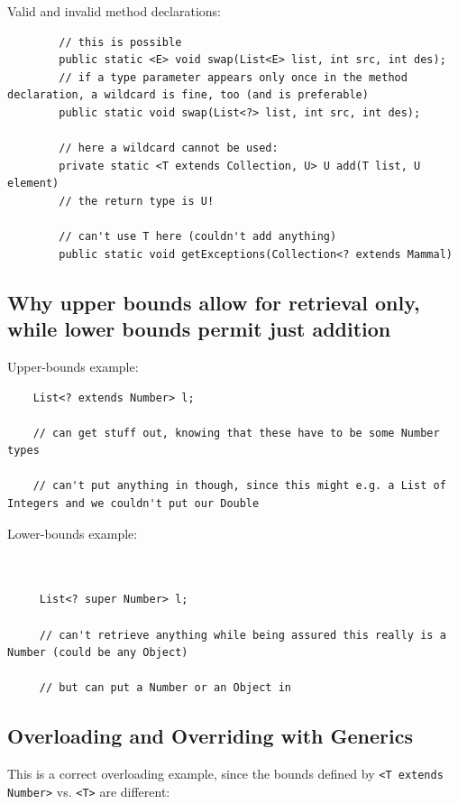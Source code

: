 \documentclass{scrartcl}
\begin{document}
    Valid and invalid method declarations:

    \begin{lstlisting}
        // this is possible
        public static <E> void swap(List<E> list, int src, int des);
        // if a type parameter appears only once in the method declaration, a wildcard is fine, too (and is preferable)
        public static void swap(List<?> list, int src, int des);

        // here a wildcard cannot be used:
        private static <T extends Collection, U> U add(T list, U element)
        // the return type is U!

        // can't use T here (couldn't add anything)
        public static void getExceptions(Collection<? extends Mammal)
    \end{lstlisting}

\subsection{Why upper bounds allow for retrieval only, while lower bounds permit just addition}

Upper-bounds example:

\begin{lstlisting}
    List<? extends Number> l;

    // can get stuff out, knowing that these have to be some Number types

    // can't put anything in though, since this might e.g. a List of Integers and we couldn't put our Double

\end{lstlisting}


Lower-bounds example:

\begin{lstlisting}


     List<? super Number> l;

     // can't retrieve anything while being assured this really is a Number (could be any Object)

     // but can put a Number or an Object in

\end{lstlisting}

\subsection{Overloading and Overriding with Generics}

This is a correct overloading example, since the bounds defined by \lstinline|<T extends Number>| vs. \lstinline|<T>| are different:
\end{document}
